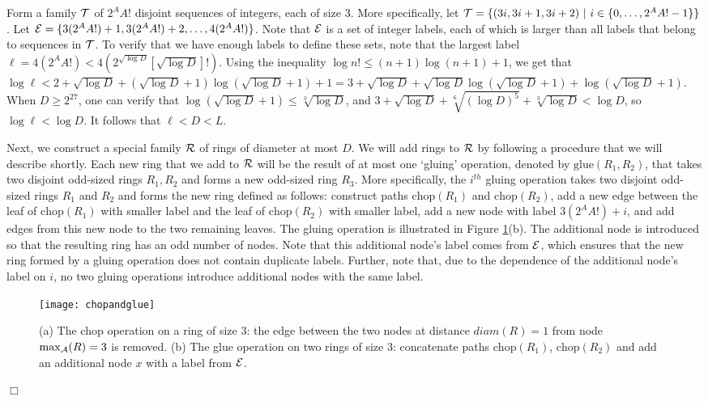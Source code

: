 \documentclass[11pt]{article}
\newcommand{\qed}{\hfill $\Box$ \bigbreak}
\newenvironment{proof}{\noindent {\bf Proof.}}{\qed}
\newcommand{\diam}[1]{\ensuremath{{diam}(#1)}}
\newcommand{\chop}[1]{\ensuremath{\mathrm{chop}(#1)}}
\newcommand{\selected}[1]{\ensuremath{\mathrm{max}_{\cal A}(#1)}}
\newcommand{\glue}[2]{\ensuremath{\mathrm{glue}(#1,#2)}}
\begin{document}
\begin{proof}
Form a family ${\cal T}$ of $2^{A}A!$ disjoint sequences of integers, each of size 3. More specifically, let ${\cal T} = \{(3i,3i+1,3i+2)\ |\ i \in \{0,\ldots,2^{A}A!-1\}\}$. Let ${\cal E} = \{3(2^{A}A!)+1, 3(2^{A}A!)+2, \ldots, 4(2^{A}A!)\}$. Note that ${\cal E}$ is a set of integer labels, each of which is larger than all labels that belong to sequences in ${\cal T}$. To verify that we have enough labels to define these sets, note that the largest label $\ell = 4(2^{A}A!) < 4(2^{\sqrt{\log D}}[\sqrt{\log D}]!)$. Using the inequality $\log n! \leq (n+1)\log(n+1) + 1$, we get that $\log \ell< 2 + \sqrt{\log D} + (\sqrt{\log D}+1)\log(\sqrt{\log D}+1) + 1 = 3 + \sqrt{\log D} + \sqrt{\log D}\log(\sqrt{\log D}+1) + \log(\sqrt{\log D}+1)$. When $D \geq 2^{27}$, one can verify that $\log(\sqrt{\log D}+1) \leq \sqrt[3]{\log D}$, and $3 + \sqrt{\log D} + \sqrt[6]{(\log D)^5} + \sqrt[3]{\log D} < \log D$, so $\log \ell < \log D$. It follows that $\ell < D <L$. 



Next, we construct a special family ${\cal R}$ of rings of diameter at most $D$. We will add rings to ${\cal R}$ by following a procedure that we will describe shortly. Each new ring that we add to ${\cal R}$ will be the result of at most one `gluing' operation, denoted by $\glue{R_1}{R_2}$, that takes two disjoint odd-sized rings $R_1,R_2$ and forms a new odd-sized ring $R_3$. More specifically, the $i^{th}$ gluing operation takes two disjoint odd-sized rings $R_1$ and $R_2$ and forms the new ring
defined as follows: construct paths $\chop{R_1}$ and $\chop{R_2}$,  add a new edge between the leaf of $\chop{R_1}$ with smaller label and the leaf of $\chop{R_2}$ with smaller label, add a new node
with label $3(2^{A}A!)+i$, and add edges from this new node to the two remaining leaves.  
The gluing operation is illustrated in Figure \ref{chopandglue}(b). The additional node is introduced so that the resulting ring has an odd number of nodes. Note that this additional node's label comes from ${\cal E}$, which ensures that the new ring formed by a gluing operation does not contain duplicate labels. Further, note that, due to the dependence of the additional node's label on $i$, no two gluing operations introduce additional nodes with the same label.

\begin{figure}[!ht]
\begin{center}
\texttt{[image: chopandglue]}
\end{center}
\caption{(a) The chop operation on a ring of size 3: the edge between the two nodes at distance $\diam{R}=1$ from node $\selected{R} = 3$ is removed. (b) The glue operation on two rings of size 3: concatenate paths $\chop{R_1}$, $\chop{R_2}$ and add an additional node $x$ with a label from ${\cal E}$.}
\label{chopandglue}
\end{figure}



\end{proof}
\end{document}

